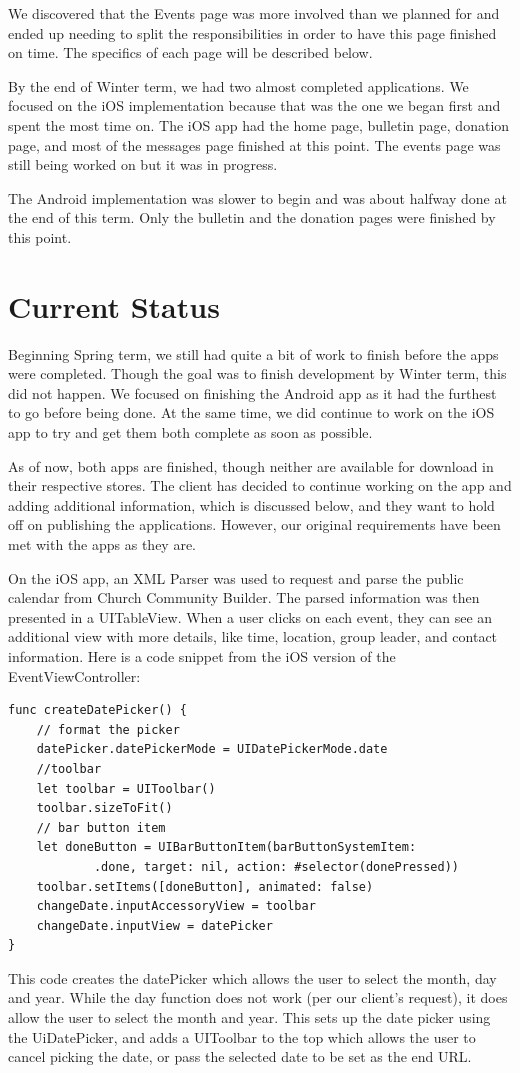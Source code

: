 \documentclass[letterpaper,10pt,draftclsnofoot,onecolumn,titlepage]{IEEEtran}
\begin{document}
		We discovered that the Events page was more involved than we planned for and ended up needing to split the responsibilities in order to have this page finished on time.
		The specifics of each page will be described below.


		By the end of Winter term, we had two almost completed applications.
		We focused on the iOS implementation because that was the one we began first and spent the most time on.
		The iOS app had the home page, bulletin page, donation page, and most of the messages page finished at this point.
		The events page was still being worked on but it was in progress.

		The Android implementation was slower to begin and was about halfway done at the end of this term.
		Only the bulletin and the donation pages were finished by this point.



\section{Current Status}
		Beginning Spring term, we still had quite a bit of work to finish before the apps were completed.
		Though the goal was to finish development by Winter term, this did not happen.
		We focused on finishing the Android app as it had the furthest to go before being done.
		At the same time, we did continue to work on the iOS app to try and get them both complete as soon as possible.

		As of now, both apps are finished, though neither are available for download in their respective stores.
		The client has decided to continue working on the app and adding additional information, which is discussed below, and they want to hold off on publishing the applications.
		However, our original requirements have been met with the apps as they are.

		On the iOS app, an XML Parser was used to request and parse the public calendar from Church Community Builder.
		The parsed information was then presented in a UITableView.
		When a user clicks on each event, they can see an additional view with more details, like time, location, group leader, and contact information.
		Here is a code snippet from the iOS version of the EventViewController:

		\begin{lstlisting}
func createDatePicker() {
    // format the picker
    datePicker.datePickerMode = UIDatePickerMode.date
    //toolbar
    let toolbar = UIToolbar()
    toolbar.sizeToFit()
    // bar button item
    let doneButton = UIBarButtonItem(barButtonSystemItem:
			.done, target: nil, action: #selector(donePressed))
    toolbar.setItems([doneButton], animated: false)
    changeDate.inputAccessoryView = toolbar
    changeDate.inputView = datePicker
}
		\end{lstlisting}
		This code creates the datePicker which allows the user to select the month, day and year.
		While the day function does not work (per our client's request), it does allow the user to select the month and year.
		This sets up the date picker using the UiDatePicker, and adds a UIToolbar to the top which allows the user to cancel picking the date,
		or pass the selected date to be set as the end URL.
\end{document}
